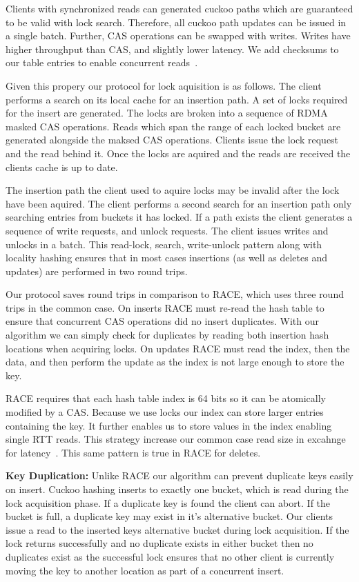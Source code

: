 Clients with synchronized reads can generated cuckoo paths
which are guaranteed to be valid with lock search.
Therefore, all cuckoo path updates can be issued in a single
batch. Further, CAS operations can be swapped with writes.
Writes have higher throughput than CAS, and slightly lower
latency. We add checksums to our table entries to enable
concurrent reads~\cite{pilaf,cell}.  ~

Given this propery our protocol for lock aquisition is as
follows. The client performs a search on its local cache for
an insertion path. A set of locks required for the insert
are generated. The locks are broken into a sequence of RDMA
masked CAS operations. Reads which span the range of each
locked bucket are generated alongside the maksed CAS
operations. Clients issue the lock request and the read
behind it. Once the locks are aquired and the reads are
received the clients cache is up to date.

The insertion path the client used to aquire locks may be
invalid after the lock have been aquired. The client
performs a second search for an insertion path only
searching entries from buckets it has locked. If a path
exists the client generates a sequence of write requests,
and unlock requests. The client issues writes and unlocks in
a batch. This read-lock, search, write-unlock pattern along
with locality hashing ensures that in most cases insertions
(as well as deletes and updates) are performed in two round
trips.

Our protocol saves round trips in comparison to RACE, which
uses three round trips in the common case. On inserts RACE
must re-read the hash table to ensure that concurrent CAS
operations did no insert duplicates. With our algorithm we
can simply check for duplicates by reading both insertion
hash locations when acquiring locks. On updates RACE must
read the index, then the data, and then perform the update
as the index is not large enough to store the key. 

RACE requires that each hash table index is 64 bits so it
can be atomically modified by a CAS. Because we use locks
our index can store larger entries containing the key. It
further enables us to store values in the index enabling
single RTT reads. This strategy increase our common case
read size in excahnge for latency~.
This same pattern is true in RACE for deletes. 

\textbf{Key Duplication:} Unlike RACE our algorithm can
prevent duplicate keys easily on insert. Cuckoo hashing
inserts to exactly one bucket, which is read during the lock
acquisition phase. If a duplicate key is found the client
can abort. If the bucket is full, a duplicate key may exist
in it's alternative bucket. Our clients issue a read to the
inserted keys alternative bucket during lock acquisition. If
the lock returns successfully and no duplicate exists in
either bucket then no duplicates exist as the successful
lock ensures that no other client is currently moving the
key to another location as part of a concurrent insert.


